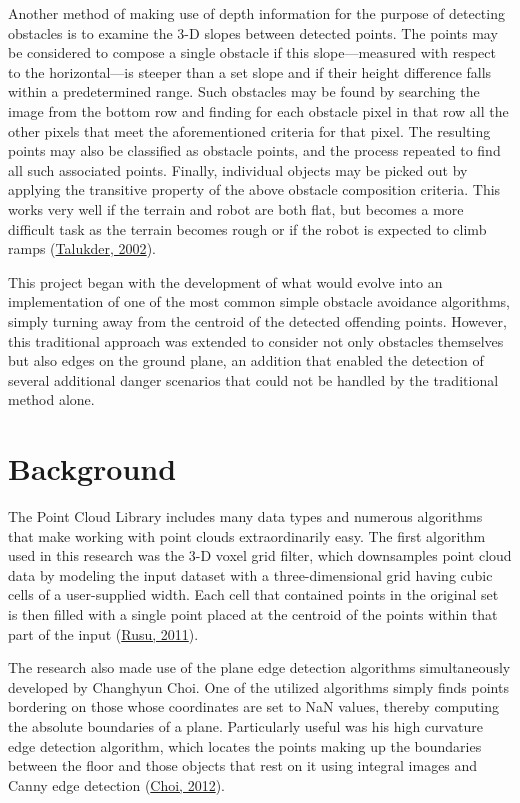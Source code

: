 \documentclass[12pt]{report}
\begin{document}
Another method of making use of depth information for the purpose of detecting obstacles is to examine the 3-D slopes between detected points.  The points may be considered to compose a single obstacle if this slope---measured with respect to the horizontal---is steeper than a set slope and if their height difference falls within a predetermined range.  Such obstacles may be found by searching the image from the bottom row and finding for each obstacle pixel in that row all the other pixels that meet the aforementioned criteria for that pixel.  The resulting points may also be classified as obstacle points, and the process repeated to find all such associated points.  Finally, individual objects may be picked out by applying the transitive property of the above obstacle composition criteria.  This works very well if the terrain and robot are both flat, but becomes a more difficult task as the terrain becomes rough or if the robot is expected to climb ramps (\hyperref[bib:talukder]{Talukder, 2002}).

This project began with the development of what would evolve into an implementation of one of the most common simple obstacle avoidance algorithms, simply turning away from the centroid of the detected offending points.  However, this traditional approach was extended to consider not only obstacles themselves but also edges on the ground plane, an addition that enabled the detection of several additional danger scenarios that could not be handled by the traditional method alone.

\section{Background}
The Point Cloud Library includes many data types and numerous algorithms that make working with point clouds extraordinarily easy.  The first algorithm used in this research was the 3-D voxel grid filter, which downsamples point cloud data by modeling the input dataset with a three-dimensional grid having cubic cells of a user-supplied width.  Each cell that contained points in the original set is then filled with a single point placed at the centroid of the points within that part of the input (\hyperref[bib:rusu]{Rusu, 2011}).

The research also made use of the plane edge detection algorithms simultaneously developed by Changhyun Choi.  One of the utilized algorithms simply finds points bordering on those whose coordinates are set to NaN values, thereby computing the absolute boundaries of a plane.  Particularly useful was his high curvature edge detection algorithm, which locates the points making up the boundaries between the floor and those objects that rest on it using integral images and Canny edge detection (\hyperref[bib:choi]{Choi, 2012}).
\end{document}
